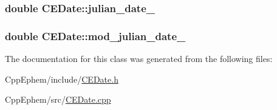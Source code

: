 \subsubsection[{julian\+\_\+date\+\_\+}]{\setlength{\rightskip}{0pt plus 5cm}double C\+E\+Date\+::julian\+\_\+date\+\_\+\hspace{0.3cm}{\ttfamily [protected]}}\label{class_c_e_date_a58170c23976d025cd631d42b10b8930c}
\hypertarget{class_c_e_date_aa713ba7b4c88ce0d453d18fb756cc645}{}
\subsubsection[{mod\+\_\+julian\+\_\+date\+\_\+}]{\setlength{\rightskip}{0pt plus 5cm}double C\+E\+Date\+::mod\+\_\+julian\+\_\+date\+\_\+\hspace{0.3cm}{\ttfamily [protected]}}\label{class_c_e_date_aa713ba7b4c88ce0d453d18fb756cc645}


The documentation for this class was generated from the following files\+:\begin{DoxyCompactItemize}
\item 
Cpp\+Ephem/include/\hyperlink{_c_e_date_8h}{C\+E\+Date.\+h}\item 
Cpp\+Ephem/src/\hyperlink{_c_e_date_8cpp}{C\+E\+Date.\+cpp}\end{DoxyCompactItemize}
